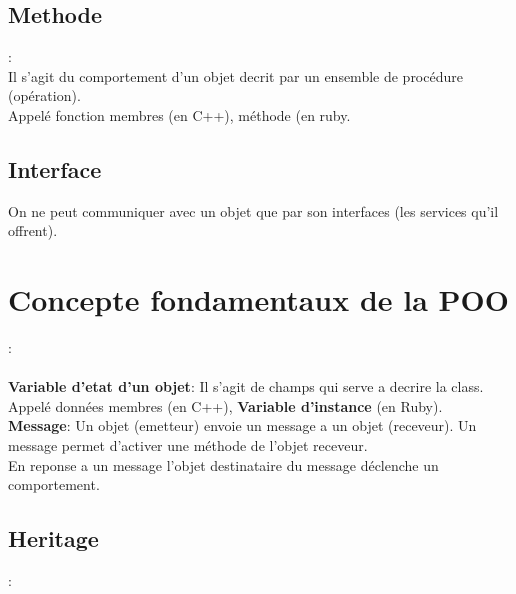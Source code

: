 \documentclass[a4paper,12pt,openany]{book}
\begin{document}
\subsection{Methode}: \\
Il s'agit du comportement d'un objet decrit par un ensemble de procédure (opération).\\
Appelé fonction membres (en C++), méthode (en ruby.\\


\subsection{Interface}

On ne peut communiquer avec un objet que par son interfaces (les services qu'il offrent).\\



\section{Concepte fondamentaux de la POO}:\\
\\

\textbf{Variable d'etat d'un objet}: Il s'agit de champs qui serve a decrire la class.\\ 
Appelé données membres (en C++), \textbf{Variable d'instance} (en Ruby).
\\
\textbf{Message}: Un objet (emetteur) envoie un message a un objet (receveur). Un message permet d'activer une méthode de l'objet receveur.\\
En reponse a un message l'objet destinataire du message déclenche un comportement.\\ 

\subsection{Heritage}: \\
\end{document}
